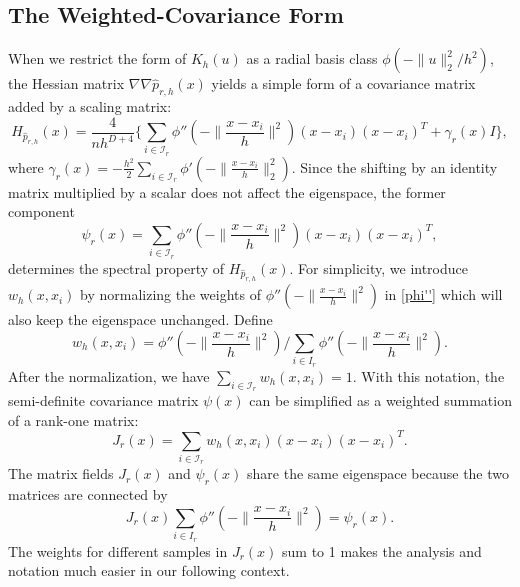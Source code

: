 \documentclass[aos,preprint]{imsart}
\theoremstyle{remark}
\begin{document}
\subsection{The Weighted-Covariance Form}
When we restrict the form of $K_h(u)$ as a radial basis class  $\phi(-\|u\|_2^2/h^2)$, the Hessian matrix $\nabla\nabla \hat{p}_{r,h}(x)$ yields a simple form of a covariance matrix added by a scaling matrix:
\begin{equation}\label{HP}
H_{\hat{p}_{r,h}}(x) =\frac{4}{nh^{D+4}}\{ \sum_{i\in {\mathcal I}_r } \phi''(-\|\frac{x-x_i}{h}\|^2)(x-x_i) (x-x_i)^T +\gamma_r(x)I\},
\end{equation}
where $\gamma_r(x) = -\frac{h^2}{2}\sum_{i\in {\mathcal I}_r} \phi'(-\|\frac{x-x_i}{h}\|_2^2)$.
Since the shifting by an identity matrix multiplied by a scalar does not affect the eigenspace, the former component 
\begin{equation}\label{phi''}
\psi_r(x) = \sum_{i\in {\mathcal I}_r } \phi''(-\|\frac{x-x_i}{h}\|^2)(x-x_i) (x-x_i)^T,
\end{equation}
determines the spectral property of $H_{\hat{p}_{r,h}}(x)$. For simplicity, we introduce $w_h(x, x_i)$ by normalizing the weights of $\phi''(-\|\frac{x-x_i}{h}\|^2)$ in \eqref{phi''} which will also keep the eigenspace unchanged. Define
\[
w_h(x, x_i) = \phi''(-\|\frac{x-x_i}{h}\|^2)/\sum_{i\in I_r}\phi''(-\|\frac{x-x_i}{h}\|^2) .
\]
After the normalization, we have $\sum_{i \in {\mathcal I}_r} w_h(x, x_i) = 1$. With this notation, the semi-definite covariance matrix $\psi(x)$ can be simplified as a weighted summation of a rank-one matrix:
\begin{equation}\label{Jx}
J_r(x) = \sum_{i\in {\mathcal I}_r } w_h(x, x_i)(x-x_i) (x-x_i)^T.
\end{equation}
The matrix fields $J_r(x)$ and $\psi_r(x)$ share the same eigenspace because the two matrices are connected by
\[
J_r(x)\sum_{i\in I_r}\phi''(-\|\frac{x-x_i}{h}\|^2) =\psi_r(x).
\]
The weights for different samples in $J_r(x)$ sum to 1 makes the analysis and notation much easier in our following context.
\end{document}
